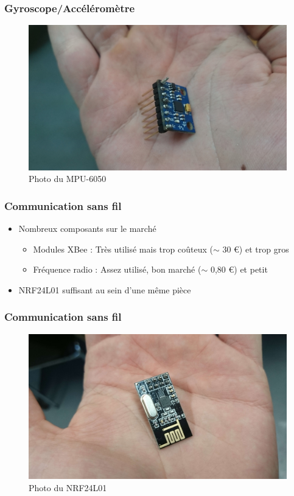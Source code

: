 \documentclass{beamer}
\begin{document}
{	\begin{frame}
	  \frametitle{Gyroscope/Accéléromètre}
	
	  \begin{figure}[htbp]
	    \centering
	    \includegraphics[scale=0.05]{img/mpu6050.jpg}
	    \caption{Photo du MPU-6050}
	  \end{figure} 
	\end{frame}
	
	\begin{frame} %
	  \frametitle{Communication sans fil}
	
	  \begin{itemize}
	    \item Nombreux composants sur le marché
	    \begin{itemize}
	      \item Modules XBee : Très utilisé mais trop coûteux ($\sim$ 30 
\euro) et trop gros
	      \item Fréquence radio : Assez utilisé, bon marché ($\sim$ 0,80 
\euro) et petit
	    \end{itemize}
	    \item NRF24L01 suffisant au sein d'une même pièce
	  \end{itemize}
	\end{frame}
	
	\begin{frame}
	  \frametitle{Communication sans fil}
	
	  \begin{figure}[htbp]
	    \centering
	    \includegraphics[scale=0.05]{img/nrf24l01.jpg}
	    \caption{Photo du NRF24L01}
	  \end{figure} 
	\end{frame}
	
}
\end{document}
